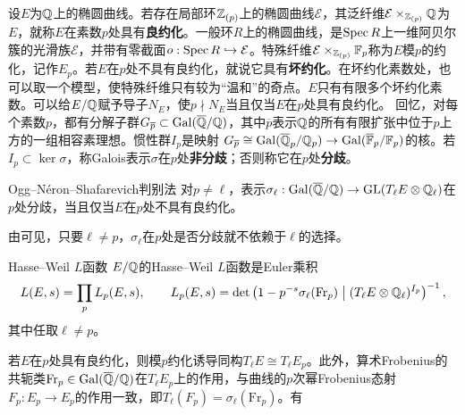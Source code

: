 设$E$为$\mathbb{Q}$上的椭圆曲线。若存在局部环$\mathbb{Z}_{(p)}$上的椭圆曲线$\mathcal E$，其泛纤维$\mathcal E\times_{\mathbb{Z}_{(p)}}\mathbb{Q}$为$E$，就称$E$在素数$p$处具有\textbf{良约化}。一般环$R$上的椭圆曲线，是$\operatorname{Spec} R$上一维阿贝尔簇的光滑族$\mathcal E$，并带有零截面$o:\operatorname{Spec} R\hookrightarrow\mathcal E$。特殊纤维$\mathcal E\times_{\mathbb{Z}_{(p)}}\mathbb{F}_p$称为$E$模$p$的约化，记作$E_p$。若$E$在$p$处不具有良约化，就说它具有\textbf{坏约化}。在坏约化素数处，也可以取一个模型，使特殊纤维只有较为“温和”的奇点。$E$只有有限多个坏约化素数。可以给$E/\mathbb{Q}$赋予导子$N_E$，使$p\nmid N_E$当且仅当$E$在$p$处具有良约化。
回忆，对每个素数$p$，都有分解子群$G_{\overline p}\subset\operatorname{Gal}(\overline{\mathbb{Q}}/\mathbb{Q})$，其中$\overline p$表示$\mathbb{Q}$的所有有限扩张中位于$p$上方的一组相容素理想。惯性群$I_p$是映射
$G_{\overline p}\cong\operatorname{Gal}(\overline{\mathbb{Q}}_p/\mathbb{Q}_p)\to\operatorname{Gal}(\overline{\mathbb{F}}_p/\mathbb{F}_p)$的核。若$I_p\subset\ker\sigma$，称Galois表示$\sigma$在$p$处\textbf{非分歧}；否则称它在$p$处\textbf{分歧}。
\begin{theorem}{Ogg--Néron--Shafarevich判别法}\label{L7S2O6}
对$p\ne\ell$，表示$\sigma_\ell:\operatorname{Gal}(\overline{\mathbb{Q}}/\mathbb{Q})\to\operatorname{GL}(T_\ell E\otimes\mathbb{Q}_\ell)$在$p$处分歧，当且仅当$E$在$p$处不具有良约化。
\end{theorem}
\begin{note}[L7S2O7]
由可见，只要$\ell\ne p$，$\sigma_\ell$在$p$处是否分歧就不依赖于$\ell$的选择。
\end{note}
\begin{definition}{Hasse--Weil $L$函数}\label{L7S2O8}
$E/\mathbb{Q}$的Hasse--Weil $L$函数是Euler乘积
\[L(E,s)=\prod_p L_p(E,s),\qquad L_p(E,s)=\det\left(1-p^{-s}\sigma_\ell(\mathrm{Fr}_p)\bigm|(T_\ell E\otimes\mathbb{Q}_\ell)^{I_p}\right)^{-1},\]
其中任取$\ell\ne p$。
\end{definition}
若$E$在$p$处具有良约化，则模$p$约化诱导同构$T_\ell E\cong T_\ell E_p$。此外，算术Frobenius的共轭类$\mathrm{Fr}_p\in\operatorname{Gal}(\overline{\mathbb{Q}}/\mathbb{Q})$在$T_\ell E_p$上的作用，与曲线的$p$次幂Frobenius态射$F_p:E_p\to E_p$的作用一致，即$T_\ell(F_p)=\sigma_\ell(\mathrm{Fr}_p)$。有
